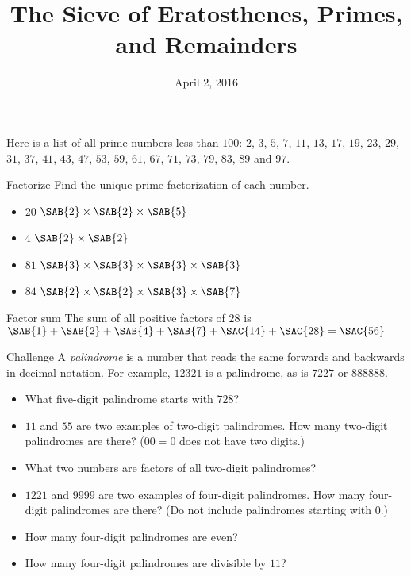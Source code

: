 \documentclass[12pt,letterpaper]{article}
\title{The Sieve of Eratosthenes, Primes, and Remainders}
\date{April 2, 2016}
\begin{document}
\maketitle

\thispagestyle{empty}

Here is a list of all prime numbers less than $100$: $2$, $3$, $5$, $7$, $11$,
$13$, $17$, $19$, $23$, $29$, $31$, $37$, $41$, $43$, $47$, $53$, $59$, $61$,
$67$, $71$, $73$, $79$, $83$, $89$ and $97$.

\begin{problem}{Factorize}
 Find the unique prime factorization of each number.

 \begin{itemize}
  \item $20$ \hfill $\SAB{2} \times \SAB{2} \times \SAB{5}$
  \item $4$ \hfill $\SAB{2} \times \SAB{2}$
  \item $81$ \hfill $\SAB{3} \times \SAB{3} \times \SAB{3} \times \SAB{3}$
  \item $84$ \hfill $\SAB{2} \times \SAB{2} \times \SAB{3} \times \SAB{7}$
 \end{itemize}
\end{problem}

\begin{problem}{Factor sum}
 The sum of all positive factors of $28$ is
 $\SAB{1} +
 \SAB{2} +
 \SAB{4} +
 \SAB{7} +
 \SAC{14} +
 \SAC{28} = \SAC{56}$
\end{problem}

\begin{problem}{Challenge}
 A \emph{palindrome} is a number that reads the same forwards and backwards in
 decimal notation. For example, $12321$ is a palindrome, as is $7227$ or
 $888888$.

 \begin{itemize}
  \item What five-digit palindrome starts with $728$? 
  \item $11$ and $55$ are two examples of two-digit palindromes.
  How many two-digit palindromes are there? ($00=0$ does not have two digits.)
  \item What two numbers are factors of all two-digit palindromes?
  \item $1221$ and $9999$ are two examples of four-digit palindromes. How many
  four-digit palindromes are there? (Do not include palindromes starting with
  $0$.) 
  \item How many four-digit palindromes are even? 
  \item How many four-digit palindromes are divisible by $11$?
 \end{itemize}
\end{problem}
\end{document}
